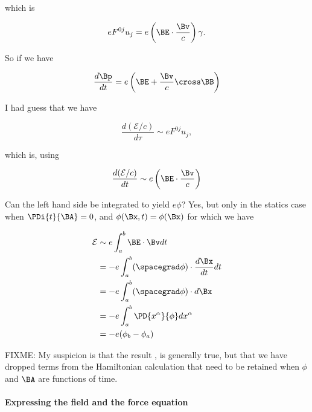 {which is

\begin{equation}\label{eqn:relativisticElectrodynamicsT3:910}
e F^{0 j} u_j = e \left(\BE \cdot \frac{\Bv}{c}\right) \gamma.
\end{equation}

So if we have

\begin{equation}\label{eqn:relativisticElectrodynamicsT3:920}
\frac{d\Bp}{dt} = e \left( \BE + \frac{\Bv}{c} \cross \BB \right)
\end{equation}

I had guess that we have

\begin{equation}\label{eqn:relativisticElectrodynamicsT3:940}
\frac{d(\mathcal{E}/c)}{d\tau} \sim e F^{0 j} u_j,
\end{equation}

which is, using 

\begin{equation}\label{eqn:relativisticElectrodynamicsT3:950}
\frac{d(\mathcal{E}/c)}{dt} \sim e \left(\BE \cdot \frac{\Bv}{c}\right)
\end{equation}

Can the left hand side be integrated to yield $e \phi$?  Yes, but only in the statics case when $\PDi{t}{\BA} = 0$, and $\phi(\Bx,t) = \phi(\Bx)$ for which we have

\begin{equation}\label{eqn:relativisticElectrodynamicsT3:1110}
\begin{aligned}
\mathcal{E} 
&\sim e \int_a^b \BE \cdot \Bv dt \\
&= -e \int_a^b (\spacegrad \phi) \cdot \frac{d \Bx}{dt} dt \\
&= -e \int_a^b (\spacegrad \phi) \cdot d \Bx \\
&= -e \int_a^b \PD{x^\alpha}{\phi} d x^\alpha \\
&= -e (\phi_b - \phi_a)
\end{aligned}
\end{equation}

FIXME: My suspicion is that the result , is generally true, but that we have dropped terms from the Hamiltonian calculation that need to be retained when $\phi$ and $\BA$ are functions of time.

\paragraph{Expressing the field and the force equation}

}
